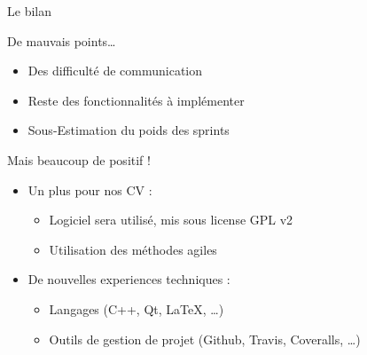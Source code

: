 \TsooSpeak{}
\begin{frame}{Le bilan} %
	\begin{alertblock}{De mauvais points…}
		\begin{itemize}
			\item Des difficulté de communication
			\item Reste des fonctionnalités à implémenter 
			\item Sous-Estimation du poids des sprints 
		\end{itemize}
	\end{alertblock}
	\vfill
	\pause
	\begin{exampleblock}{Mais beaucoup de positif !}
		\begin{itemize}
			\item Un plus pour nos CV :
				\begin{itemize}
					\item Logiciel sera utilisé, mis sous license GPL v2
					\item Utilisation des méthodes agiles
				\end{itemize}
	
			\item De nouvelles experiences techniques :
				\begin{itemize}
					\item Langages (C++, Qt, \LaTeX{}, \ldots)
					\item Outils de gestion de projet (Github, Travis, Coveralls, \ldots)
				\end{itemize}
		\end{itemize}
	\end{exampleblock}

	\vfill
\end{frame}

